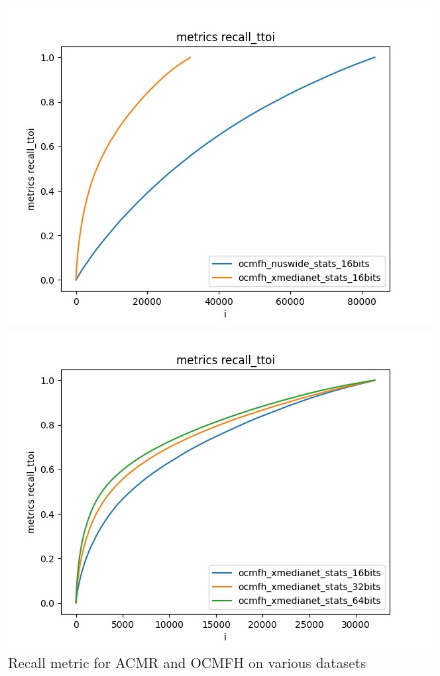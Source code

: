 \begin{figure}[H]
            \begin{minipage}[!h]{0.5\linewidth}
                \centering
                \includegraphics[width=\linewidth]{resultsImages/recall/metrics recall_ttoi_ocmfh_both.jpeg}
            \end{minipage}
            \begin{minipage}[!h]{0.5\linewidth}
                \centering
                \includegraphics[width=\linewidth]{resultsImages/recall/metrics recall_ttoi_ocmfh_xmedia.jpeg}
            \end{minipage}
        \caption{Recall metric for ACMR and OCMFH on various datasets}
        \label{fig:}
        \end{figure}
        \FloatBarrier